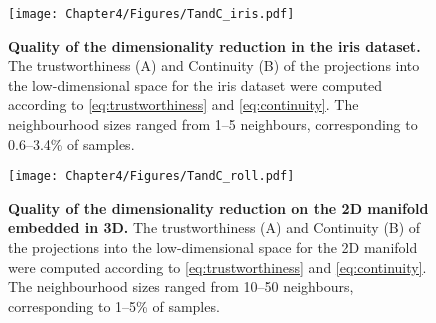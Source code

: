 \begin{figure}[hbtp]
	\centering
	\texttt{[image: Chapter4/Figures/TandC\_iris.pdf]}
	\caption[\textbf{Quality of the dimensionality reduction in the iris dataset.}]{\textbf{Quality of the dimensionality reduction in the iris dataset.} The trustworthiness (A)  and Continuity (B) of the projections into the low-dimensional space for the iris dataset were computed according to \cref{eq:trustworthiness} and \cref{eq:continuity}. The neighbourhood sizes ranged from \numrange{1}{5} neighbours, corresponding to \numrange{0.6}{3.4}\% of samples.}
	 	\label{fig:TandC-iris}
\end{figure}


\begin{figure}[hbtp]
	\centering
	\texttt{[image: Chapter4/Figures/TandC\_roll.pdf]}
	\caption[\textbf{Quality of the dimensionality reduction on the 2D manifold embedded in 3D.}]{\textbf{Quality of the dimensionality reduction on the 2D manifold embedded in 3D.} The trustworthiness (A)  and Continuity (B) of the projections into the low-dimensional space for the 2D manifold were computed according to \cref{eq:trustworthiness} and \cref{eq:continuity}. The neighbourhood sizes ranged from \numrange{10}{50} neighbours, corresponding to \numrange{1}{5}\% of samples.} 
	 	\label{fig:dimRed-roll}
\end{figure}

